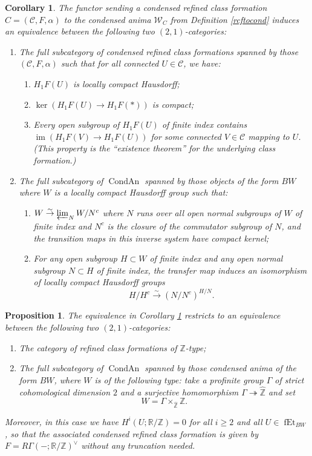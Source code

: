 \documentclass[10pt,a4paper]{amsart}
\newtheorem{proposition}{Proposition}
\newtheorem{corollary}{Corollary}
\newcommand{\mbb}{\mathbb}
\newcommand{\mc}{\mathcal}
\newcommand{\on}{\operatorname}
\newcommand{\wh}{\widehat}
\begin{document}
\begin{corollary}\label{weildeterminesrcf}
The functor sending a condensed refined class formation $C = (\mc{C},F,\alpha)$ to the condensed anima $\mc{W}_C$
from Definition \ref{rcftocond} induces an equivalence between the following two $(2,1)$-categories:
\begin{enumerate}
\item The full subcategory of condensed refined class formations spanned by those $(\mc{C},F,\alpha)$ such that for all connected $U\in\mc{C}$, we have:
\begin{enumerate}
\item $H_1F(U)$ is locally compact Hausdorff;
\item $\on{ker}(H_1F(U)\to H_1F(\ast))$ is compact;
\item Every open subgroup of $H_1F(U)$ of finite index contains $\on{im}(H_1F(V)\to H_1F(U))$ for some connected $V\in\mc{C}$ mapping to $U$. (This property is the ``existence theorem'' for the underlying class formation.)
\end{enumerate}

\item The full subcategory of $\on{CondAn}$ spanned by those objects of the form $BW$ where $W$ is a locally compact Hausdorff group such that:
\begin{enumerate}
\item $W\overset{\sim}{\rightarrow}\varprojlim_N W/N^c$ where $N$ runs over all open normal subgroups of $W$ of finite index and $N^c$ is the closure of the commutator subgroup of $N$, and the transition maps in this inverse system have compact kernel;
\item For any open subgroup $H\subset W$ of finite index and any open normal subgroup $N\subset H$ of finite index, the transfer map induces an isomorphism of locally compact Hausdorff groups
$$H/H^c\overset{\sim}{\rightarrow} (N/N^c)^{H/N}.$$

\end{enumerate}
\end{enumerate}
\end{corollary}

\begin{proposition}\label{ztype}
The equivalence in Corollary \ref{weildeterminesrcf} restricts to an equivalence between the following two $(2,1)$-categories:

\begin{enumerate}
\item The category of refined class formations of $\mbb{Z}$-type;
\item The full subcategory of $\on{CondAn}$ spanned by those condensed anima of the form $BW$, where $W$ is of the following type: take a profinite group $\Gamma$ of \emph{strict cohomological dimension $2$} and a surjective homomorphism $\Gamma\twoheadrightarrow \wh{\mbb{Z}}$ and set
$$W= \Gamma\times_{\wh{\mbb{Z}}}\mbb{Z}.$$
\end{enumerate}
Moreover, in this case we have $H^i(U;\mbb{R}/\mbb{Z})=0$ for all $i\geq 2$ and all $U\in\on{fEt}_{BW}$, so that the associated condensed refined class formation is given by $F=R\Gamma(-;\mbb{R}/\mbb{Z})^\vee$ without any truncation needed.
\end{proposition}
\end{document}

